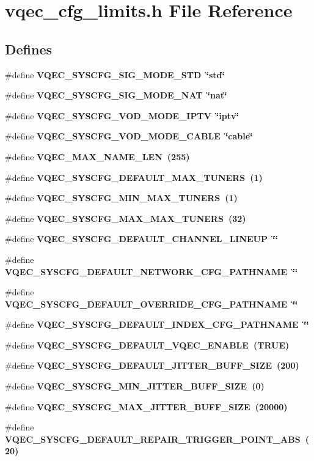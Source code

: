 \section{vqec\_\-cfg\_\-limits.h File Reference}
\label{vqec__cfg__limits_8h}
\subsection*{Defines}
\begin{CompactItemize}
\item 
\#define \bf{VQEC\_\-SYSCFG\_\-SIG\_\-MODE\_\-STD}~\char`\"{}std\char`\"{}
\item 
\#define \bf{VQEC\_\-SYSCFG\_\-SIG\_\-MODE\_\-NAT}~\char`\"{}nat\char`\"{}
\item 
\#define \bf{VQEC\_\-SYSCFG\_\-VOD\_\-MODE\_\-IPTV}~\char`\"{}iptv\char`\"{}
\item 
\#define \bf{VQEC\_\-SYSCFG\_\-VOD\_\-MODE\_\-CABLE}~\char`\"{}cable\char`\"{}
\item 
\#define \bf{VQEC\_\-MAX\_\-NAME\_\-LEN}~(255)
\item 
\#define \bf{VQEC\_\-SYSCFG\_\-DEFAULT\_\-MAX\_\-TUNERS}~(1)
\item 
\#define \bf{VQEC\_\-SYSCFG\_\-MIN\_\-MAX\_\-TUNERS}~(1)
\item 
\#define \bf{VQEC\_\-SYSCFG\_\-MAX\_\-MAX\_\-TUNERS}~(32)
\item 
\#define \bf{VQEC\_\-SYSCFG\_\-DEFAULT\_\-CHANNEL\_\-LINEUP}~\char`\"{}\char`\"{}
\item 
\#define \bf{VQEC\_\-SYSCFG\_\-DEFAULT\_\-NETWORK\_\-CFG\_\-PATHNAME}~\char`\"{}\char`\"{}
\item 
\#define \bf{VQEC\_\-SYSCFG\_\-DEFAULT\_\-OVERRIDE\_\-CFG\_\-PATHNAME}~\char`\"{}\char`\"{}
\item 
\#define \bf{VQEC\_\-SYSCFG\_\-DEFAULT\_\-INDEX\_\-CFG\_\-PATHNAME}~\char`\"{}\char`\"{}
\item 
\#define \bf{VQEC\_\-SYSCFG\_\-DEFAULT\_\-VQEC\_\-ENABLE}~(\bf{TRUE})
\item 
\#define \bf{VQEC\_\-SYSCFG\_\-DEFAULT\_\-JITTER\_\-BUFF\_\-SIZE}~(200)
\item 
\#define \bf{VQEC\_\-SYSCFG\_\-MIN\_\-JITTER\_\-BUFF\_\-SIZE}~(0)
\item 
\#define \bf{VQEC\_\-SYSCFG\_\-MAX\_\-JITTER\_\-BUFF\_\-SIZE}~(20000)
\item 
\#define \bf{VQEC\_\-SYSCFG\_\-DEFAULT\_\-REPAIR\_\-TRIGGER\_\-POINT\_\-ABS}~(20)
\item 

\end{CompactItemize}
